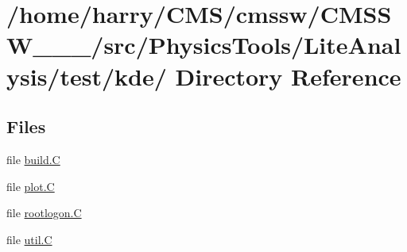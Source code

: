 \hypertarget{dir_000004}{
\section{/home/harry/CMS/cmssw/CMSSW\_\_\_/src/Physics\-Tools/Lite\-Analysis/test/kde/ Directory Reference}
\label{dir_000004}
}


\subsection*{Files}
\begin{CompactItemize}
\item 
file \hyperlink{build_8C}{build.C}
\item 
file \hyperlink{plot_8C}{plot.C}
\item 
file \hyperlink{rootlogon_8C}{rootlogon.C}
\item 
file \hyperlink{util_8C}{util.C}
\end{CompactItemize}
